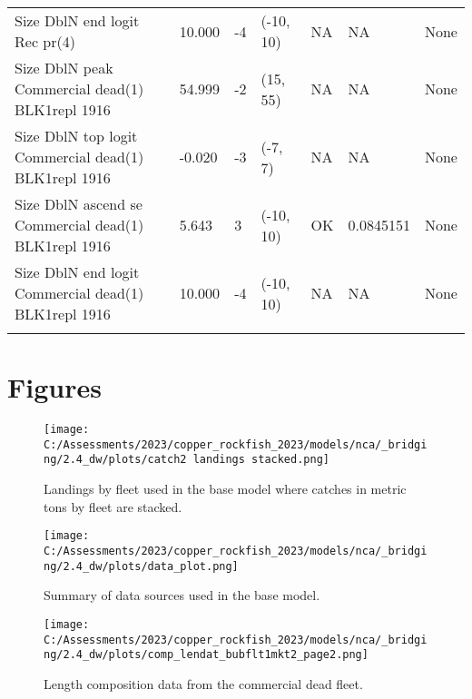 \documentclass[11pt,
  english,
  letterpaper,
]{article}
\begin{document}
\begin{landscape}
\begin{longtable}[t]{>{\raggedright\arraybackslash}p{7cm}lllll>{\raggedright\arraybackslash}p{4cm}}
Size DblN end logit Rec pr(4) & 10.000 & -4 & (-10, 10) & NA & NA & None\\
Size DblN peak Commercial dead(1) BLK1repl 1916 & 54.999 & -2 & (15, 55) & NA & NA & None\\
Size DblN top logit Commercial dead(1) BLK1repl 1916 & -0.020 & -3 & (-7, 7) & NA & NA & None\\
Size DblN ascend se Commercial dead(1) BLK1repl 1916 & 5.643 & 3 & (-10, 10) & OK & 0.0845151 & None\\
Size DblN end logit Commercial dead(1) BLK1repl 1916 & 10.000 & -4 & (-10, 10) & NA & NA & None\\*
\end{longtable}
\endgroup{}
\end{landscape}
\endgroup{}







\newpage

\clearpage

\hypertarget{figures}{%
\section{Figures}\label{figures}}

\begin{figure}
\centering
\texttt{[image: C:/Assessments/2023/copper\_rockfish\_2023/models/nca/\_bridging/2.4\_dw/plots/catch2 landings stacked.png]}
\caption{Landings by fleet used in the base model where catches in metric tons by fleet are stacked.\label{fig:catch}}
\end{figure}

\begin{figure}
\centering
\texttt{[image: C:/Assessments/2023/copper\_rockfish\_2023/models/nca/\_bridging/2.4\_dw/plots/data\_plot.png]}
\caption{Summary of data sources used in the base model.\label{fig:data-plot}}
\end{figure}

\begin{figure}
\centering
\texttt{[image: C:/Assessments/2023/copper\_rockfish\_2023/models/nca/\_bridging/2.4\_dw/plots/comp\_lendat\_bubflt1mkt2\_page2.png]}
\caption{Length composition data from the commercial dead fleet.\label{fig:com-dead-len-data}}
\end{figure}
\end{document}
